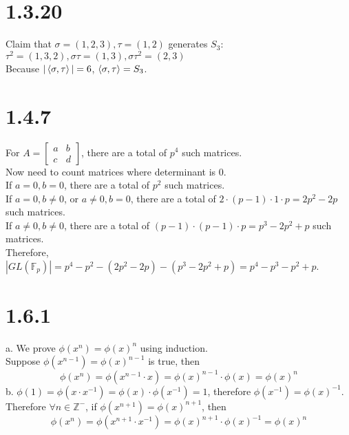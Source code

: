 \documentclass{article}
\begin{document}
\section{1.3.20}
\begin{addmargin}[1em]{0em}
Claim that $\sigma = (1,2,3),\tau = (1,2)$ generates $S_3$:\\
$\tau^2 = (1,3,2), \sigma\tau = (1,3), \sigma\tau^2=(2,3)$\\
Because $|\braket{\sigma, \tau}| = 6$, $\braket{\sigma, \tau} = S_3$.
\end{addmargin}
\section{1.4.7}
For $A = \begin{bmatrix}
a & b\\
c & d
\end{bmatrix}$, there are a total of $p^4$ such matrices.\\
Now need to count matrices where determinant is $0$.\\
If $a=0, b = 0$, there are a total of $p^2$ such matrices.\\
If $a=0, b \neq 0$, or $a \neq 0, b=0$, there are a total of $2 \cdot (p-1) \cdot 1 \cdot p = 2p^2 - 2p$ such matrices.\\
If $a \neq 0, b \neq 0$, there are a total of $(p-1) \cdot (p-1) \cdot p = p^3 - 2p^2 + p$ such matrices.\\
Therefore, $|GL(\mathbb{F}_p)| = p^4 - p^2 - (2p^2 - 2p) - (p^3 - 2p^2 + p) = p^4 - p^3 - p^2 + p$.
\section{1.6.1}
a. We prove $\phi(x^n) = \phi(x)^n$ using induction.\\
Suppose $\phi(x^{n-1}) = \phi(x)^{n-1}$ is true, then
\begin{equation*}
    \phi(x^n) = \phi(x^{n-1} \cdot x) = \phi(x)^{n-1} \cdot \phi(x) = \phi(x)^n
\end{equation*}
b. $\phi(1) = \phi(x \cdot x^{-1}) = \phi(x) \cdot \phi(x^{-1}) = 1$, therefore $\phi(x^{-1}) = \phi(x)^{-1}$.\\
Therefore $\forall n \in \mathbb{Z}^-$, if $\phi(x^{n+1}) = \phi(x)^{n+1}$, then
\begin{equation*}
    \phi(x^{n}) = \phi(x^{n+1} \cdot x^{-1}) = \phi(x)^{n+1} \cdot \phi(x)^{-1} = \phi(x)^n
\end{equation*}
\end{document}
